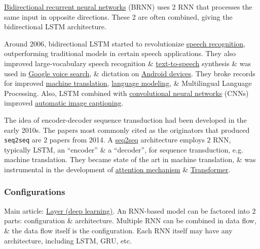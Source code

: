 \documentclass{article}
\begin{document}
\begin{itemize}
	\href{https://en.wikipedia.org/wiki/Bidirectional_recurrent_neural_networks}{Bidirectional recurrent neural networks} (BRNN) uses 2 RNN that processes the same input in opposite directions. These 2 are often combined, giving the bidirectional LSTM architecture.
	
	Around 2006, bidirectional LSTM started to revolutionize \href{https://en.wikipedia.org/wiki/Speech_recognition}{speech recognition}, outperforming traditional models in certain speech applications. They also improved large-vocabulary speech recognition \& \href{https://en.wikipedia.org/wiki/Text-to-speech}{text-to-speech} synthesis \& was used in \href{https://en.wikipedia.org/wiki/Google_Voice_Search}{Google voice search}, \& dictation on \href{https://en.wikipedia.org/wiki/Android_(operating_system)}{Android devices}. They broke records for improved \href{https://en.wikipedia.org/wiki/Machine_translation}{machine translation}, \href{https://en.wikipedia.org/wiki/Language_Modeling}{language modeling}, \& Multilingual Language Processing. Also, LSTM combined with \href{https://en.wikipedia.org/wiki/Convolutional_neural_network}{convolutional neural networks} (CNNs) improved \href{https://en.wikipedia.org/wiki/Automatic_image_captioning}{automatic image captioning}.
	
	The idea of encoder-decoder sequence transduction had been developed in the early 2010s. The papers most commonly cited as the originators that produced {\tt seq2seq} are 2 papers from 2014. A \href{https://en.wikipedia.org/wiki/Seq2seq}{seq2seq} architecture employs 2 RNN, typically LSTM, an ``encoder'' \& a ``decoder'', for sequence transduction, e.g. machine translation. They became state of the art in machine translation, \& was instrumental in the development of \href{https://en.wikipedia.org/wiki/Attention_(machine_learning)}{attention mechanism} \& \href{https://en.wikipedia.org/wiki/Transformer_(deep_learning_architecture)}{Transformer}.
\end{itemize}

\subsubsection{Configurations}
Main article: \href{https://en.wikipedia.org/wiki/Layer_(deep_learning)}{Layer (deep learning)}. An RNN-based model can be factored into 2 parts: configuration \& architecture. Multiple RNN can be combined in data flow, \& the data flow itself is the configuration. Each RNN itself may have any architecture, including LSTM, GRU, etc.
\end{document}
